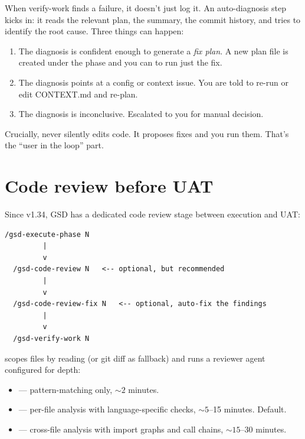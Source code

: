 \documentclass[11pt,letterpaper,openany]{book}
\begin{document}
When verify-work finds a failure, it doesn't just log it. An auto-diagnosis step kicks in: it reads the relevant plan, the summary, the commit history, and tries to identify the root cause. Three things can happen:

\begin{enumerate}[itemsep=2pt]
  \item The diagnosis is confident enough to generate a \emph{fix plan}. A new plan file is created under the phase and you can  to run just the fix.
  \item The diagnosis points at a config or context issue. You are told to re-run  or edit CONTEXT.md and re-plan.
  \item The diagnosis is inconclusive. Escalated to you for manual decision.
\end{enumerate}

Crucially,  never silently edits code. It proposes fixes and you run them. That's the ``user in the loop'' part.

\section{Code review before UAT}

Since v1.34, GSD has a dedicated code review stage between execution and UAT:

\begin{lstlisting}[style=gsddiagram]
  /gsd-execute-phase N
         |
         v
  /gsd-code-review N   <-- optional, but recommended
         |
         v
  /gsd-code-review-fix N   <-- optional, auto-fix the findings
         |
         v
  /gsd-verify-work N
\end{lstlisting}

 scopes files by reading  (or git diff as fallback) and runs a reviewer agent configured for depth:

\begin{itemize}[itemsep=2pt]
  \item {} --- pattern-matching only, ${\sim}2$ minutes.
  \item {} --- per-file analysis with language-specific checks, ${\sim}5$--15 minutes. Default.
  \item {} --- cross-file analysis with import graphs and call chains, ${\sim}15$--30 minutes.
\end{itemize}
\end{document}
